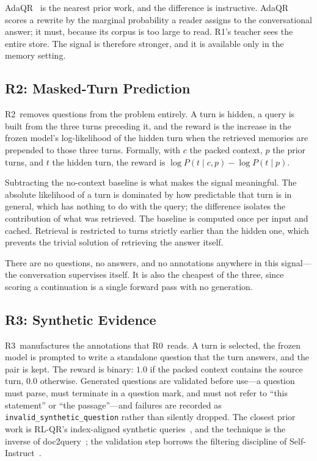 \documentclass[12pt,letterpaper,oneside]{report}
\newcommand{\code}[1]{\texttt{\small #1}}
\newcommand{\Rz}{R0}
\newcommand{\Ra}{R1}
\newcommand{\Rb}{R2}
\newcommand{\Rc}{R3}
\begin{document}
AdaQR~\cite{adaqr} is the nearest prior work, and the difference is
instructive. AdaQR scores a rewrite by the marginal probability a reader
assigns to the conversational answer; it must, because its corpus is too large
to read. \Ra's teacher sees the entire store. The signal is therefore stronger,
and it is available only in the memory setting.

\subsection{\Rb: Masked-Turn Prediction}

\Rb\ removes questions from the problem entirely. A turn is hidden, a query is
built from the three turns preceding it, and the reward is the increase in the
frozen model's log-likelihood of the hidden turn when the retrieved memories
are prepended to those three turns. Formally, with $c$ the packed context, $p$
the prior turns, and $t$ the hidden turn, the reward is
$\log P(t \mid c, p) - \log P(t \mid p)$.

Subtracting the no-context baseline is what makes the signal meaningful. The
absolute likelihood of a turn is dominated by how predictable that turn is in
general, which has nothing to do with the query; the difference isolates the
contribution of what was retrieved. The baseline is computed once per input and
cached. Retrieval is restricted to turns strictly earlier than the hidden one,
which prevents the trivial solution of retrieving the answer itself.

There are no questions, no answers, and no annotations anywhere in this
signal---the conversation supervises itself. It is also the cheapest of the
three, since scoring a continuation is a single forward pass with no
generation.

\subsection{\Rc: Synthetic Evidence}

\Rc\ manufactures the annotations that \Rz\ reads. A turn is selected, the
frozen model is prompted to write a standalone question that the turn answers,
and the pair is kept. The reward is binary: $1.0$ if the packed context
contains the source turn, $0.0$ otherwise. Generated questions are validated
before use---a question must parse, must terminate in a question mark, and must
not refer to ``this statement'' or ``the passage''---and failures are recorded
as \code{invalid\_synthetic\_question} rather than silently dropped. The
closest prior work is RL-QR's index-aligned synthetic queries~\cite{rlqr}, and
the technique is the inverse of doc2query~\cite{doc2query}; the validation step
borrows the filtering discipline of Self-Instruct~\cite{selfinstruct}.
\end{document}

